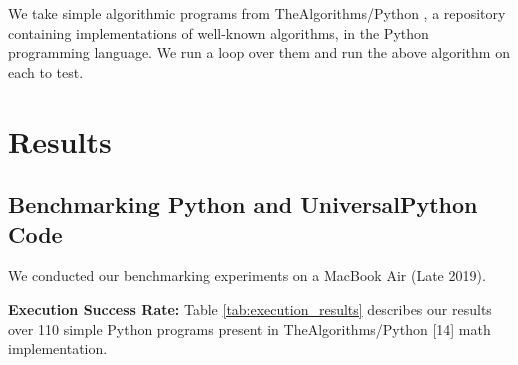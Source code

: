 \documentclass[conference]{IEEEtran}
\begin{document}
We take simple algorithmic programs from TheAlgorithms/Python \cite{thealgorithms_python}, a repository containing implementations of well-known algorithms, in the Python programming language. We run a loop over them and run the above algorithm on each to test.

\section{Results}

\subsection{Benchmarking Python and UniversalPython Code}

We conducted our benchmarking experiments on a MacBook Air (Late 2019).

\textbf{Execution Success Rate:} Table \ref{tab:execution_results} describes our results over 110 simple Python programs present in TheAlgorithms/Python [14] math implementation.
\end{document}
